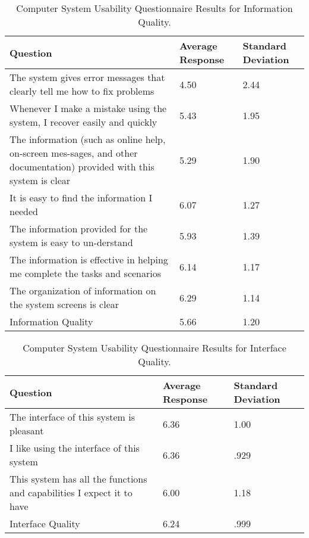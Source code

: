 \documentclass[twocolumn]{bmcart}%
\begin{document}
\begin{backmatter}
\begin{table}[h!]
\caption{Computer System Usability Questionnaire Results for Information Quality.}
      \begin{tabular}{L{3.85cm}R{1.2cm}R{1.2cm}}
      \hline
      Question & Average Response & Standard Deviation \\ \hline
      The system gives error messages that clearly tell me how to fix problems & 4.50 & 2.44 \\
      Whenever I make a mistake using the system, I recover easily and quickly & 5.43 & 1.95 \\
      The information (such as online help, on-screen mes-sages, and other documentation) provided     with this system is clear & 5.29 & 1.90 \\
      It is easy to find the information I needed & 6.07 & 1.27 \\
      The information provided for the system is easy to un-derstand &  5.93 & 1.39 \\
      The information is effective in helping me complete the tasks and scenarios & 6.14 & 1.17 \\
      The organization of information on the system screens is clear & 6.29 & 1.14 \\ \hline
      Information Quality & 5.66 & 1.20 \\ \hline
      \end{tabular}
\label{tbl:CSUQInformationQualityResults}
\end{table}

\begin{table}[h!]
\caption{Computer System Usability Questionnaire Results for Interface Quality.}
      \begin{tabular}{L{3.85cm}R{1.2cm}R{1.2cm}}
      \hline
      Question & Average Response & Standard Deviation \\ \hline
      The interface of this system is pleasant & 6.36 & 1.00 \\
      I like using the interface of this system & 6.36 & .929 \\
      This system has all the functions and capabilities I expect it to have & 6.00 & 1.18 \\ \hline
      Interface Quality & 6.24 & .999 \\ \hline
      \end{tabular}
\label{tbl:CSUQInterfaceQualityResults}
\end{table}


\end{backmatter}
\end{document}
